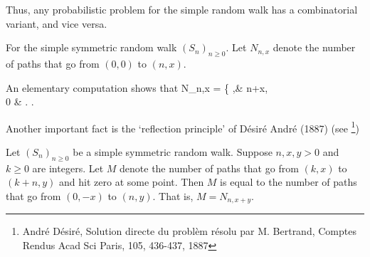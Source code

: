 Thus, any probabilistic problem for the simple random walk has a combinatorial variant, and vice versa.

\begin{definition}\label{def:paths_count_simple_symmetric_random_walk}
For the simple symmetric random walk $(S_n)_{n\geq 0}$. Let $N_{n,x}$ denote the number of paths that go from $(0,0)$ to $(n,x)$.

An elementary computation shows that
\be
N_{n,x} = \left\{
,\quad\quad & n+x,\\
0 & .
\ea\right.
\ee
\end{definition}

Another important fact is the `reflection principle' of D\'esir\'e Andr\'e (1887) (see \footnote{Andr\'e D\'esir\'e, Solution directe du probl\`em r\'esolu par M. Bertrand, Comptes Rendus Acad Sci Paris, 105, 436-437, 1887})

\begin{theorem}\label{thm:reflection_principle_simple_symmetric_random_walk}
Let $(S_n)_{n\geq 0}$ be a simple symmetric random walk. Suppose $n,x,y>0$ and $k\geq 0$ are integers. Let $M$ denote the number of paths that go from $(k,x)$ to $(k+n,y)$ and hit zero at some point. Then $M$ is equal to the number of paths that go from $(0,-x)$ to $(n,y)$. That is, $M=N_{n,x+y}$.
\end{theorem}

